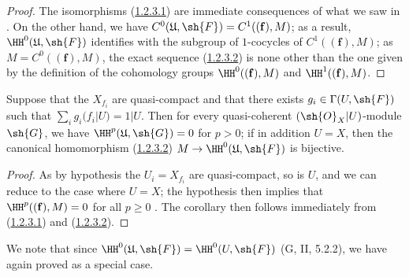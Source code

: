 \begin{proof}
The isomorphisms (\hyperref[III.1.2.3.1]{1.2.3.1}) are immediate consequences of what we saw in .
On the other hand, we have $C^0(\mathfrak{U},\sh{F})=C^1((\mathbf{f}),M)$; as a result, $\HH^0(\mathfrak{U},\sh{F})$ identifies with the subgroup of $1$-cocycles of $C^1((\mathbf{f}),M)$; as $M=C^0((\mathbf{f}),M)$, the exact sequence (\hyperref[III.1.2.3.2]{1.2.3.2}) is none other than the one given by the definition of the cohomology groups $\HH^0((\mathbf{f}),M)$ and $\HH^1((\mathbf{f}),M)$.
\end{proof}

\begin{corollary}[1.2.4]
\label{III.1.2.4}
Suppose that the $X_{f_i}$ are quasi-compact and that there exists $g_i\in\Gamma(U,\sh{F})$ such that $\sum_i g_i(f_i|U)=1|U$.
Then for every quasi-coherent $(\sh{O}_X|U)$-module $\sh{G}$, we have $\HH^p(\mathfrak{U},\sh{G})=0$ for $p>0$; if in addition $U=X$, then the canonical homomorphism (\hyperref[III.1.2.3.2]{1.2.3.2}) $M\to\HH^0(\mathfrak{U},\sh{F})$ is bijective.
\end{corollary}

\begin{proof}
As by hypothesis the $U_i=X_{f_i}$ are quasi-compact, so is $U$, and we can reduce to the case where $U=X$; the hypothesis then implies that $\HH^p((\mathbf{f}),M)=0$ for all $p\geq 0$ .
The corollary then follows immediately from (\hyperref[III.1.2.3.1]{1.2.3.1}) and (\hyperref[III.1.2.3.2]{1.2.3.2}).
\end{proof}

We note that since $\HH^0(\mathfrak{U},\sh{F})=\HH^0(U,\sh{F})$ (G, II, 5.2.2), we have again proved  as a special case.

